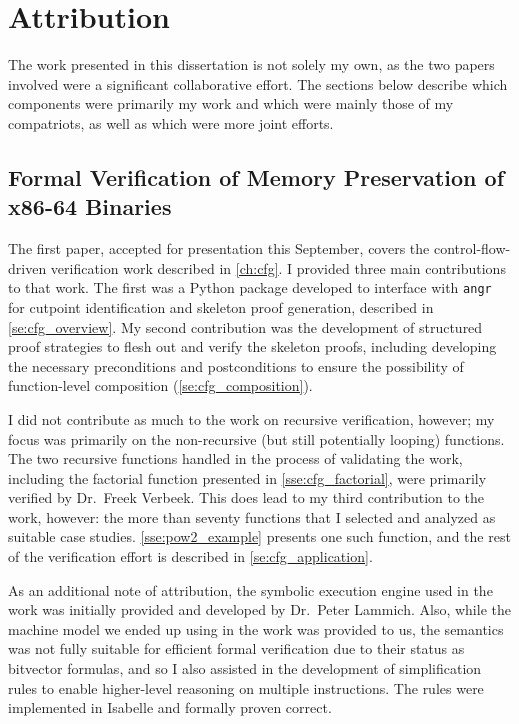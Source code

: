 \chapter{Attribution}\label{attribution}
The work presented in this dissertation is not solely my own,
as the two papers involved were a significant collaborative effort.
The sections below describe which components were primarily my work
and which were mainly those of my compatriots, as well as which were more joint efforts.

\section*{Formal Verification of Memory Preservation of x86-64 Binaries}\label{attribute1}
The first paper, accepted for presentation this September,
covers the control-flow-driven verification work described in \cref{ch:cfg}.
I provided three main contributions to that work.
The first was a Python package developed to interface with \texttt{angr}
for cutpoint identification and skeleton proof generation,
described in \cref{se:cfg_overview}.
My second contribution was the development of structured proof strategies
to flesh out and verify the skeleton proofs,
including developing the necessary preconditions and postconditions to ensure
the possibility of function-level composition (\cref{se:cfg_composition}).

I did not contribute as much to the work on recursive verification, however;
my focus was primarily on the non-recursive (but still potentially looping) functions.
The two recursive functions handled in the process of validating the work,
including the factorial function presented in \cref{sse:cfg_factorial},
were primarily verified by Dr.~Freek Verbeek.
This does lead to my third contribution to the work, however:
the more than seventy functions that I selected and analyzed as suitable case studies.
\cref{sse:pow2_example} presents one such function,
and the rest of the verification effort is described in \cref{se:cfg_application}.

As an additional note of attribution, the symbolic execution engine
used in the work was initially provided and developed by Dr.~Peter Lammich.
Also, while the machine model we ended up using in the work was provided to us,
the semantics was not fully suitable for efficient formal verification
due to their status as bitvector formulas,
and so I also assisted in the development of simplification rules
to enable higher-level reasoning on multiple instructions.
The rules were implemented in Isabelle and formally proven correct.


